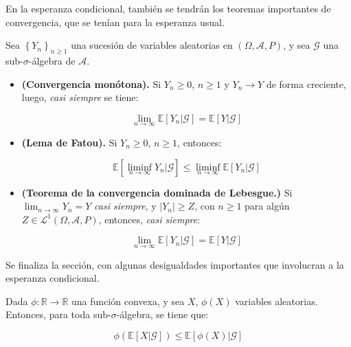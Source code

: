 En la esperanza condicional, también se tendrán los teoremas importantes de convergencia, que se tenían para la esperanza usual.

\begin{theorem}
	Sea $\left\{ Y_n \right\}_{n \geq 1}$ una sucesión de variables aleatorias en $(\Omega, \mathcal{A}, P)$, y sea $\mathcal{G}$ una sub-$\sigma$-álgebra de $\mathcal{A}$.

	\begin{itemize}
		\item \textbf{(Convergencia monótona).} Si $Y_n \geq 0$, $n \geq 1$ y $Y_n \rightarrow Y$ de forma creciente, luego, \textit{casi siempre} se tiene:

		\[
			\lim_{n \rightarrow \infty} \mathbb{E}[Y_n \vert \mathcal{G}] = \mathbb{E}[Y \vert \mathcal{G}]
		\]

		\item \textbf{(Lema de Fatou).} Si $Y_n \geq 0$, $n \geq 1$, entonces:

		\[
			\mathbb{E}[ \liminf_{n \rightarrow \infty} Y_n \vert \mathcal{G} ] \leq \liminf_{n \rightarrow \infty} \mathbb{E}[Y_n \vert \mathcal{G}]
		\]

		\item \textbf{(Teorema de la convergencia dominada de Lebesgue.)} Si $\lim_{n \rightarrow \infty} Y_n = Y$ \textit{casi siempre}, y $\lvert Y_n \rvert \geq Z$, con $n \geq 1$ para algún $Z \in \mathcal{L}^1 (\Omega, \mathcal{A}, P)$, entonces, \textit{casi siempre}:

		\[
			\lim_{n \rightarrow \infty} \mathbb{E}[Y_n \vert \mathcal{G}] = \mathbb{E}[Y \vert \mathcal{G}]
		\]


	\end{itemize}

\end{theorem}

Se finaliza la sección, con algunas desigualdades importantes que involucran a la esperanza condicional.

\begin{theorem}
	Dada $\phi: \mathbb{R} \rightarrow \mathbb{R}$ una función convexa, y sea $X$, $\phi(X)$ variables aleatorias. Entonces, para toda sub-$\sigma$-álgebra, se tiene que:

	\[
		\phi \left( \mathbb{E}[X \vert \mathcal{G}] \right) \leq \mathbb{E}[\phi(X) \vert \mathcal{G} ]
	\]
\end{theorem}

